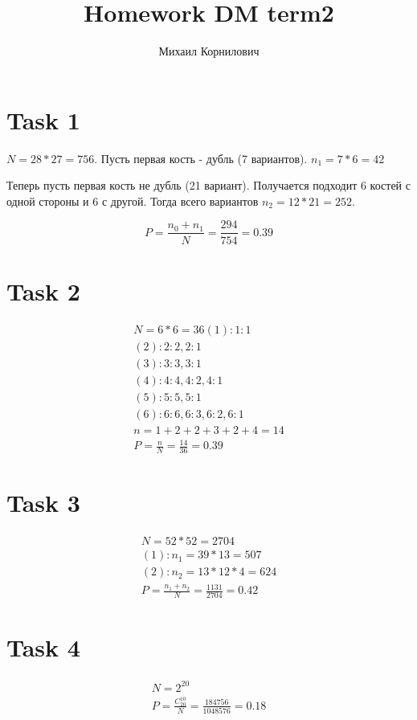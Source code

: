 \documentclass{article}
\title{Homework DM term2}
\author{Михаил Корнилович}
\begin{document}
    \maketitle
    \newpage
	
	\section{Task 1}
	$N = 28 * 27 = 756$. Пусть первая кость - дубль (7 вариантов). $n_1 = 7 * 6 = 42$
	
	\noindent Теперь пусть первая кость не дубль (21 вариант). Получается подходит 6 костей с одной стороны и 6 с другой. Тогда всего вариантов $n_2 = 12 * 21 = 252$.
	
	$$
		P = \frac{n_0 + n_1}{N} = \frac{294}{754} = 0.39
	$$
	
	\section{Task 2}
	
	\begin{align*}
		N = 6 * 6 = 36
		(1): 1 : 1 \\
		(2): 2 : 2, 2 : 1 \\
		(3): 3 : 3, 3 : 1 \\
		(4): 4 : 4, 4 : 2, 4 : 1 \\
		(5): 5 : 5, 5 : 1 \\
		(6): 6 : 6, 6 : 3, 6 : 2, 6 : 1 \\
		n = 1 + 2 + 2 + 3 + 2 + 4 = 14 \\
		P = \frac{n}{N} = \frac{14}{36} = 0.39
	\end{align*}
	
	\section{Task 3}
	
	\begin{align*}
		N = 52 * 52 = 2704 \\
		(1): n_1 = 39 * 13 = 507 \\
		(2): n_2 = 13 * 12 * 4 = 624 \\
		P = \frac{n_1 + n_2}{N} = \frac{1131}{2704} = 0.42
	\end{align*}
	
	\section{Task 4}
	\begin{align*}
		N = 2^{20} \\
		P = \frac{C_{20}^{10}}{N} = \frac{184756}{1048576} = 0.18
	\end{align*}
	
\end{document}
